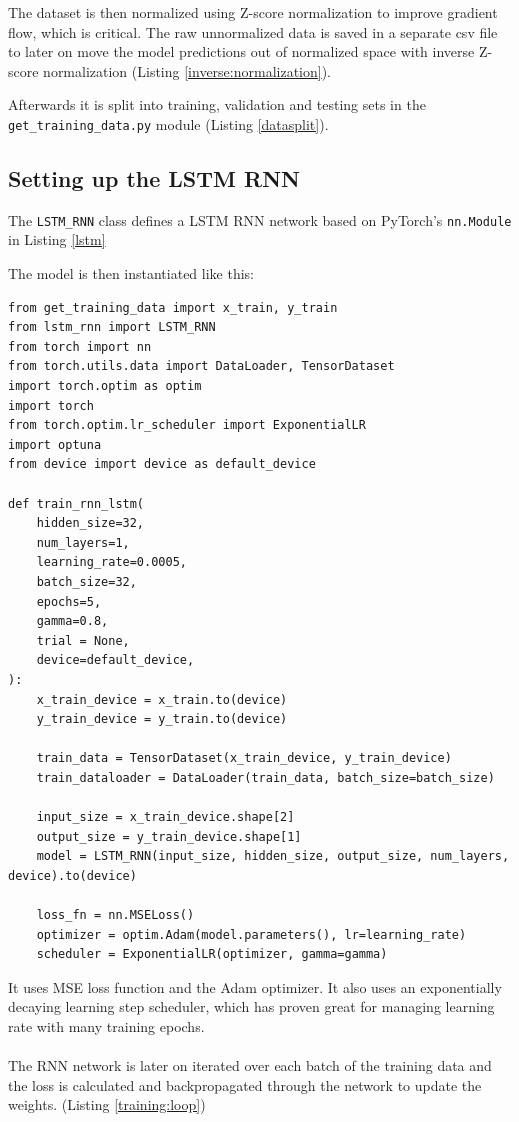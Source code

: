 \documentclass[11pt]{article}
\begin{document}
The dataset is then normalized using Z-score normalization to improve gradient flow, which is critical. The raw unnormalized data is saved in a separate csv file to later on move the model predictions out of normalized space with inverse Z-score normalization (Listing \ref{inverse:normalization}).


Afterwards it is split into training, validation and testing sets in the \texttt{get\_training\_data.py} module (Listing \ref{datasplit}).

\subsection{Setting up the LSTM RNN}

The \texttt{LSTM\_RNN} class defines a LSTM RNN network based on PyTorch's \texttt{nn.Module} in Listing \ref{lstm}


The model is then instantiated like this:
\begin{lstlisting}
from get_training_data import x_train, y_train
from lstm_rnn import LSTM_RNN
from torch import nn
from torch.utils.data import DataLoader, TensorDataset
import torch.optim as optim
import torch
from torch.optim.lr_scheduler import ExponentialLR
import optuna
from device import device as default_device

def train_rnn_lstm(
    hidden_size=32,
    num_layers=1,
    learning_rate=0.0005,
    batch_size=32,
    epochs=5,
    gamma=0.8,
    trial = None,
    device=default_device,
):
    x_train_device = x_train.to(device)
    y_train_device = y_train.to(device)

    train_data = TensorDataset(x_train_device, y_train_device)
    train_dataloader = DataLoader(train_data, batch_size=batch_size)

    input_size = x_train_device.shape[2]
    output_size = y_train_device.shape[1]
    model = LSTM_RNN(input_size, hidden_size, output_size, num_layers, device).to(device)

    loss_fn = nn.MSELoss()
    optimizer = optim.Adam(model.parameters(), lr=learning_rate)
    scheduler = ExponentialLR(optimizer, gamma=gamma)
\end{lstlisting}

 It uses MSE loss function and the Adam optimizer. It also uses an exponentially decaying learning step scheduler, which has proven great for managing learning rate with many training epochs. \\ \\  The RNN network is later on iterated over each batch of the training data and the loss is calculated and backpropagated through the network to update the weights. (Listing \ref{training:loop})
\end{document}
